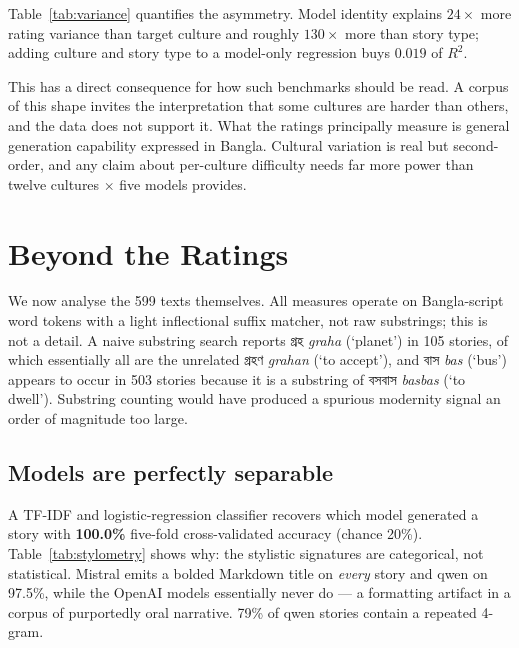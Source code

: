 \documentclass[11pt]{article}
\newcommand{\bn}[1]{{\bnfont #1}}
\begin{document}
Table~\ref{tab:variance} quantifies the asymmetry. Model identity explains
$24\times$ more rating variance than target culture and roughly $130\times$
more than story type; adding culture and story type to a model-only regression
buys $0.019$ of $R^2$.

This has a direct consequence for how such benchmarks should be read. A corpus
of this shape invites the interpretation that some cultures are harder than
others, and the data does not support it. What the ratings principally measure
is general generation capability expressed in Bangla. Cultural variation is
real but second-order, and any claim about per-culture difficulty needs far
more power than twelve cultures $\times$ five models provides.

\section{Beyond the Ratings}
\label{sec:beyond}

We now analyse the 599 texts themselves. All measures operate on Bangla-script
word tokens with a light inflectional suffix matcher, not raw substrings; this
is not a detail. A naive substring search reports \bn{গ্রহ} \textit{graha} (`planet') in
105 stories, of which essentially all are the unrelated \bn{গ্রহণ} \textit{grahan}
(`to accept'), and \bn{বাস} \textit{bas} (`bus') appears to occur in 503 stories because it is
a substring of \bn{বসবাস} \textit{basbas} (`to dwell'). Substring counting would have
produced a spurious modernity signal an order of magnitude too large.

\subsection{Models are perfectly separable}
\label{sec:stylometry}

A TF-IDF and logistic-regression classifier recovers which model generated a
story with \textbf{100.0\%} five-fold cross-validated accuracy (chance 20\%).
Table~\ref{tab:stylometry} shows why: the stylistic signatures are
categorical, not statistical. Mistral emits a bolded Markdown title on
\emph{every} story and qwen on 97.5\%, while the OpenAI models essentially
never do --- a formatting artifact in a corpus of purportedly oral narrative.
79\% of qwen stories contain a repeated 4-gram.
\end{document}
